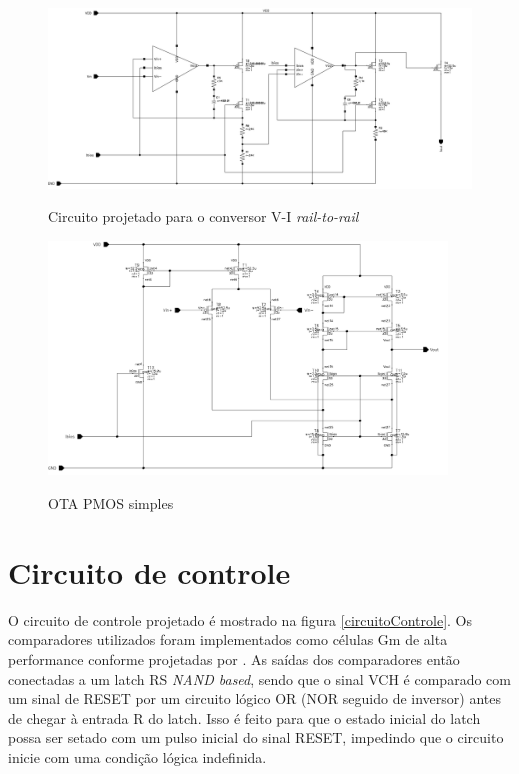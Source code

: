 \documentclass[
	12pt,				%
	oneside,			%
	a4paper,			%
	english,			%
	french,				%
	spanish,			%
	brazil				%
	]{abntex2}
\begin{document}
\begin{figure}[!ht]
  \centering
  \includegraphics[width=450pt]{circuitoFFVA.png}\\
  \caption{Circuito projetado para o conversor V-I \textit{rail-to-rail}}\label{circuitoVI}
\end{figure}

\begin{figure}[!ht]
  \centering
  \includegraphics[width=300pt]{OTAsimples.png}\\
  \caption{OTA PMOS simples}\label{OTAsimples}
\end{figure}

\section{Circuito de controle}
O circuito de controle projetado é mostrado na figura \ref{circuitoControle}. Os comparadores utilizados foram implementados como células Gm de alta performance conforme projetadas por . As saídas dos comparadores então conectadas a um latch RS \textit{NAND based}, sendo que o sinal VCH é comparado com um sinal de RESET por um circuito lógico OR (NOR seguido de inversor) antes de chegar à entrada R do latch. Isso é feito para que o estado inicial do latch possa ser setado com um pulso inicial do sinal RESET, impedindo que o circuito inicie com uma condição lógica indefinida.     
\end{document}
